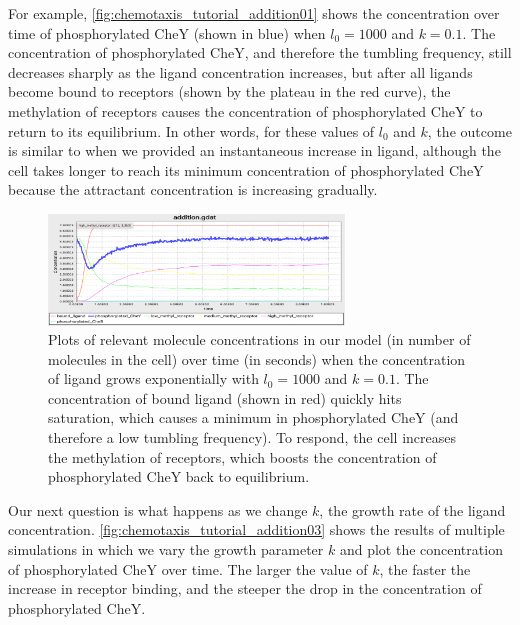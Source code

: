 For example, \autoref{fig:chemotaxis_tutorial_addition01} shows the concentration over time of phosphorylated CheY (shown in blue) when $l_0 = 1000$ and $k = 0.1$. The concentration of phosphorylated CheY, and therefore the tumbling frequency, still decreases sharply as the ligand concentration increases, but after all ligands become bound to receptors (shown by the plateau in the red curve), the methylation of receptors causes the concentration of phosphorylated CheY to return to its equilibrium. In other words, for these values of $l_0$ and $k$, the outcome is similar to when we provided an instantaneous increase in ligand, although the cell takes longer to reach its minimum concentration of phosphorylated CheY because the attractant concentration is increasing gradually.

\begin{figure}[h]
\centering
\mySfFamily
\includegraphics[width = 0.7\textwidth]{../images/chemotaxis_tutorial_addition01.png}
\caption{Plots of relevant molecule concentrations in our model (in number of molecules in the cell) over time (in seconds) when the concentration of ligand grows exponentially with $l_0 = 1000$ and $k = 0.1$. The concentration of bound ligand (shown in red) quickly hits saturation, which causes a minimum in phosphorylated CheY (and therefore a low tumbling frequency). To respond, the cell increases the methylation of receptors, which boosts the concentration of phosphorylated CheY back to equilibrium.}
\label{fig:chemotaxis_tutorial_addition01}
\end{figure}


Our next question is what happens as we change $k$, the growth rate of the ligand concentration. \autoref{fig:chemotaxis_tutorial_addition03} shows the results of multiple simulations in which we vary the growth parameter $k$ and plot the concentration of phosphorylated CheY over time. The larger the value of $k$, the faster the increase in receptor binding, and the steeper the drop in the concentration of phosphorylated CheY.

